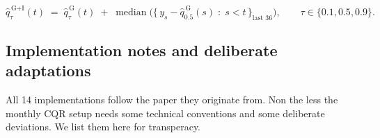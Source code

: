 \begin{equation}
  \hat q^{\,\text{G+I}}_{\tau}(t) \;=\; \hat q^{\,\text{G}}_{\tau}(t)
    \;+\; \operatorname{median}\!\Big(
      \big\{\, y_s - \hat q^{\,\text{G}}_{0.5}(s) \;:\; s < t \,\big\}_{\text{last }36}
    \Big),
  \qquad \tau \in \{0.1, 0.5, 0.9\}.
  \label{eq:gplusi}
\end{equation}

\subsection{Implementation notes and deliberate adaptations}
\label{sec:conformal:notes}

All 14 implementations follow the paper they originate from. Non the less the monthly CQR setup needs some technical conventions and some deliberate deviations. We list them here for transperacy.


